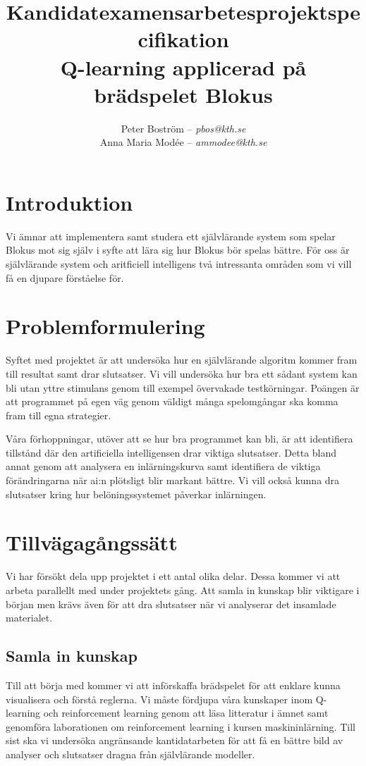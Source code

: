\documentclass[a4paper,11pt]{article}
\title{Kandidatexamensarbetesprojektspecifikation\\\vspace{4pt}\normalsize Q-learning applicerad på brädspelet Blokus}
\author{Peter Boström -- \emph{pbos@kth.se}\\Anna Maria Modée -- \emph{ammodee@kth.se}}
\begin{document}
\maketitle
 \pagestyle{fancyplain}

\section*{Introduktion}

Vi ämnar att implementera samt studera ett självlärande system som spelar Blokus mot sig själv i syfte att lära sig hur Blokus bör spelas bättre. För oss är självlärande system och aritficiell intelligens två intressanta områden som vi vill få en djupare förståelse för.

\section*{Problemformulering}

Syftet med projektet är att undersöka hur en självlärande algoritm kommer fram till resultat samt drar slutsatser. Vi vill undersöka hur bra ett sådant system kan bli utan yttre stimulans genom till exempel övervakade testkörningar. Poängen är att programmet på egen väg genom väldigt många spelomgångar ska komma fram till egna strategier.

Våra förhoppningar, utöver att se hur bra programmet kan bli, är att identifiera tillstånd där den artificiella intelligensen drar viktiga slutsatser. Detta bland annat genom att analysera en inlärningskurva samt identifiera de viktiga förändringarna när ai:n plötsligt blir markant bättre. Vi vill också kunna dra slutsatser kring hur belöningssystemet påverkar inlärningen.

\section*{Tillvägagångssätt}

Vi har försökt dela upp projektet i ett antal olika delar. Dessa kommer vi att arbeta parallellt med under projektets gång. Att samla in kunskap blir viktigare i början men krävs även för att dra slutsatser när vi analyserar det insamlade materialet.

\subsection*{Samla in kunskap}

Till att börja med kommer vi att införskaffa brädspelet för att enklare kunna visualisera och förstå reglerna. Vi måste fördjupa våra kunskaper inom Q-learning och reinforcement learning genom att läsa litteratur i ämnet samt genomföra laborationen om reinforcement learning i kursen maskininlärning. Till sist ska vi undersöka angränsande kantidatarbeten för att få en bättre bild av analyser och slutsatser dragna från självlärande modeller.
\end{document}
